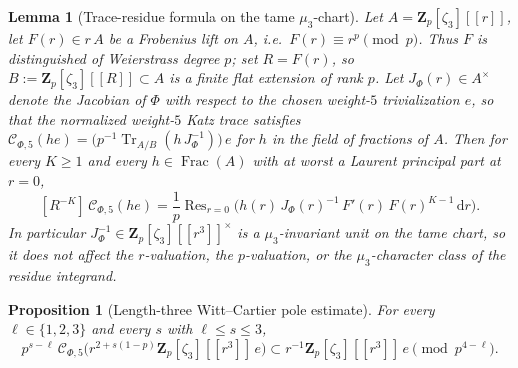 \documentclass[10pt,a4paper]{amsart}
\newtheorem{lemma}{Lemma}
\newtheorem{proposition}{Proposition}
\newcommand{\Res}{\operatorname{Res}}
\newcommand{\Tr}{\operatorname{Tr}}
\newcommand{\Z}{\mathbf{Z}}
\newcommand{\dd}{\mathrm{d}}
\begin{document}
\begin{lemma}[Trace-residue formula on the tame $\mu_3$-chart]\label{lem:trace-residue-tame}
Let $A=\Z_p[\zeta_3][[r]]$, let $F(r)\in r\,A$ be a Frobenius lift on $A$, i.e.\ $F(r)\equiv r^p\pmod p$. Thus $F$ is distinguished of Weierstrass degree $p$; set $R=F(r)$, so $B:=\Z_p[\zeta_3][[R]]\subset A$ is a finite flat extension of rank $p$. Let $J_\Phi(r)\in A^\times$ denote the Jacobian of $\Phi$ with respect to the chosen weight-$5$ trivialization $e$, so that the normalized weight-$5$ Katz trace satisfies $\mathcal C_{\Phi,5}(he)=\bigl(p^{-1}\Tr_{A/B}(h\,J_\Phi^{-1})\bigr)\,e$ for $h$ in the field of fractions of $A$. Then for every $K\ge 1$ and every $h\in\operatorname{Frac}(A)$ with at worst a Laurent principal part at $r=0$,
\begin{equation}\label{eq:trace-residue}
[R^{-K}]\,\mathcal C_{\Phi,5}(he)=\frac{1}{p}\Res_{r=0}\!\bigl(h(r)\,J_\Phi(r)^{-1}\,F'(r)\,F(r)^{K-1}\,\dd r\bigr).
\end{equation}
In particular $J_\Phi^{-1}\in\Z_p[\zeta_3][[r^3]]^\times$ is a $\mu_3$-invariant unit on the tame chart, so it does not affect the $r$-valuation, the $p$-valuation, or the $\mu_3$-character class of the residue integrand.
\end{lemma}

\begin{proposition}[Length-three Witt--Cartier pole estimate]\label{prop:pole-estimate}\label{prop:pole-estimate-star}
For every $\ell\in\{1,2,3\}$ and every $s$ with $\ell\le s\le 3$,
\begin{equation}\label{eq:star}
p^{s-\ell}\,\mathcal C_{\Phi,5}\!\bigl(r^{2+s(1-p)}\Z_p[\zeta_3][[r^3]]\,e\bigr)\subset r^{-1}\Z_p[\zeta_3][[r^3]]\,e\pmod{p^{4-\ell}}.
\end{equation}
\end{proposition}
\end{document}
